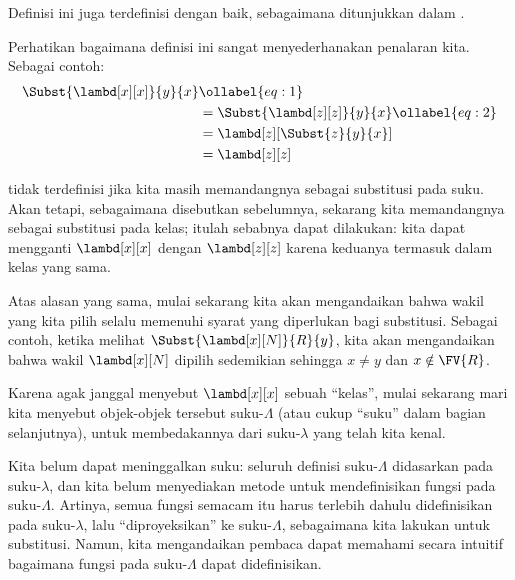 \documentclass[../../../include/open-logic-section]{subfiles}
\begin{document}
Definisi ini juga terdefinisi dengan baik, sebagaimana ditunjukkan dalam
.

Perhatikan bagaimana definisi ini sangat menyederhanakan penalaran kita.
Sebagai contoh:
\begin{align}
  \Subst{\lambd[x][x]}{y}{x} & \ollabel{eq:1}\\
  &= \Subst{\lambd[z][z]}{y}{x} \ollabel{eq:2}\\
  &= \lambd[z][\Subst{z}{y}{x}] \\
  &= \lambd[z][z]
\end{align}

 tidak terdefinisi jika kita masih memandangnya sebagai
substitusi pada suku. Akan tetapi, sebagaimana disebutkan sebelumnya, sekarang
kita memandangnya sebagai substitusi pada kelas; itulah sebabnya
 dapat dilakukan: kita dapat mengganti $\lambd[x][x]$ dengan
$\lambd[z][z]$ karena keduanya termasuk dalam kelas yang sama.

Atas alasan yang sama, mulai sekarang kita akan mengandaikan bahwa wakil yang
kita pilih selalu memenuhi syarat yang diperlukan bagi substitusi. Sebagai
contoh, ketika melihat $\Subst{\lambd[x][N]}{R}{y}$, kita akan mengandaikan
bahwa wakil $\lambd[x][N]$ dipilih sedemikian sehingga $x \neq y$ dan
$x \notin \FV{R}$.

Karena agak janggal menyebut $\lambd[x][x]$ sebuah ``kelas'', mulai sekarang
mari kita menyebut objek-objek tersebut suku-$\Lambda$ (atau cukup ``suku''
dalam bagian selanjutnya), untuk membedakannya dari suku-$\lambda$ yang telah
kita kenal.

\begin{editorial}
  Kita belum dapat meninggalkan suku: seluruh definisi suku-$\Lambda$
  didasarkan pada suku-$\lambda$, dan kita belum menyediakan metode untuk
  mendefinisikan fungsi pada suku-$\Lambda$. Artinya, semua fungsi semacam itu
  harus terlebih dahulu didefinisikan pada suku-$\lambda$, lalu
  ``diproyeksikan'' ke suku-$\Lambda$, sebagaimana kita lakukan untuk
  substitusi. Namun, kita mengandaikan pembaca dapat memahami secara intuitif
  bagaimana fungsi pada suku-$\Lambda$ dapat didefinisikan.
\end{editorial}
\end{document}
